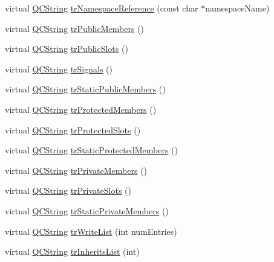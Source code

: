 \begin{DoxyCompactItemize}
\item 
virtual \hyperlink{class_q_c_string}{Q\+C\+String} \hyperlink{class_translator_serbian_a38ce36fd281fa65f02a5840aaaf7e770}{tr\+Namespace\+Reference} (const char $\ast$namespace\+Name)
\item 
virtual \hyperlink{class_q_c_string}{Q\+C\+String} \hyperlink{class_translator_serbian_a81946123335a7eb0ff88248f4c365555}{tr\+Public\+Members} ()
\item 
virtual \hyperlink{class_q_c_string}{Q\+C\+String} \hyperlink{class_translator_serbian_a1902f9e4ce1c0174008519b8a87af406}{tr\+Public\+Slots} ()
\item 
virtual \hyperlink{class_q_c_string}{Q\+C\+String} \hyperlink{class_translator_serbian_a57800acadb981e1ed23a029f3bda4f60}{tr\+Signals} ()
\item 
virtual \hyperlink{class_q_c_string}{Q\+C\+String} \hyperlink{class_translator_serbian_aa669332ea712935af4dc51b1251be05d}{tr\+Static\+Public\+Members} ()
\item 
virtual \hyperlink{class_q_c_string}{Q\+C\+String} \hyperlink{class_translator_serbian_a6c5396f3512c4b0eaf12b686dc4b9edb}{tr\+Protected\+Members} ()
\item 
virtual \hyperlink{class_q_c_string}{Q\+C\+String} \hyperlink{class_translator_serbian_ae5c7c4043e5b037aa90e260f941fd8b8}{tr\+Protected\+Slots} ()
\item 
virtual \hyperlink{class_q_c_string}{Q\+C\+String} \hyperlink{class_translator_serbian_ad481c06a7937627adc8a95ca051388be}{tr\+Static\+Protected\+Members} ()
\item 
virtual \hyperlink{class_q_c_string}{Q\+C\+String} \hyperlink{class_translator_serbian_aaa8b9fb056a16cfed8aa7ac08ccd1536}{tr\+Private\+Members} ()
\item 
virtual \hyperlink{class_q_c_string}{Q\+C\+String} \hyperlink{class_translator_serbian_aed558ff8f0bbf640002a3b5bde2aef4a}{tr\+Private\+Slots} ()
\item 
virtual \hyperlink{class_q_c_string}{Q\+C\+String} \hyperlink{class_translator_serbian_a1b0cdb1b4943ac3a0a9f4c4974b35ab7}{tr\+Static\+Private\+Members} ()
\item 
virtual \hyperlink{class_q_c_string}{Q\+C\+String} \hyperlink{class_translator_serbian_aba929588153054499fe94a62e62b3328}{tr\+Write\+List} (int num\+Entries)
\item 
virtual \hyperlink{class_q_c_string}{Q\+C\+String} \hyperlink{class_translator_serbian_ab27718cda7872ab5e36b0f0fcdc4e2a0}{tr\+Inherits\+List} (int)
\item 

\end{DoxyCompactItemize}
